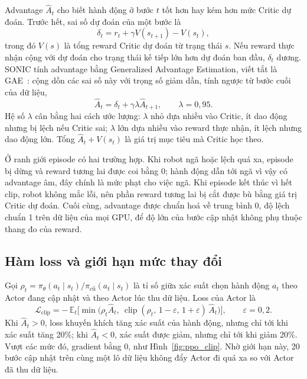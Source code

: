\documentclass[12pt,a4paper,oneside]{report}
\begin{document}
Advantage $\hat A_t$ cho biết hành động ở bước $t$ tốt hơn hay kém hơn mức Critic dự đoán. Trước hết, sai số dự đoán của một bước là
\begin{equation}
\delta_t = r_t + \gamma V(s_{t+1}) - V(s_t),
\end{equation}
trong đó $V(s)$ là tổng reward Critic dự đoán từ trạng thái $s$. Nếu reward thực nhận cộng với dự đoán cho trạng thái kế tiếp lớn hơn dự đoán ban đầu, $\delta_t$ dương. SONIC tính advantage bằng Generalized Advantage Estimation, viết tắt là GAE~\cite{gae}: cộng dồn các sai số này với trọng số giảm dần, tính ngược từ bước cuối của dữ liệu,
\begin{equation}
\hat A_t = \delta_t + \gamma \lambda \hat A_{t+1}, \qquad \lambda = 0{,}95.
\label{eq:gae}
\end{equation}
Hệ số $\lambda$ cân bằng hai cách ước lượng: $\lambda$ nhỏ dựa nhiều vào Critic, ít dao động nhưng bị lệch nếu Critic sai; $\lambda$ lớn dựa nhiều vào reward thực nhận, ít lệch nhưng dao động lớn. Tổng $\hat A_t + V(s_t)$ là giá trị mục tiêu mà Critic học theo.

Ở ranh giới episode có hai trường hợp. Khi robot ngã hoặc lệch quá xa, episode bị dừng và reward tương lai được coi bằng 0; hành động dẫn tới ngã vì vậy có advantage âm, đây chính là mức phạt cho việc ngã. Khi episode kết thúc vì hết clip, robot không mắc lỗi, nên phần reward tương lai bị cắt được bù bằng giá trị Critic dự đoán. Cuối cùng, advantage được chuẩn hoá về trung bình 0, độ lệch chuẩn 1 trên dữ liệu của mọi GPU, để độ lớn của bước cập nhật không phụ thuộc thang đo của reward.

\subsection{Hàm loss và giới hạn mức thay đổi}
\label{sec:ppo_loss}

Gọi $\rho_t = \pi_\theta(a_t \mid s_t) / \pi_{\text{cũ}}(a_t \mid s_t)$ là tỉ số giữa xác suất chọn hành động $a_t$ theo Actor đang cập nhật và theo Actor lúc thu dữ liệu. Loss của Actor là
\begin{equation}
\mathcal{L}_{\text{clip}} = -\,\mathbb{E}_t\Big[\min\big(\rho_t \hat A_t,\ \operatorname{clip}(\rho_t,\, 1-\varepsilon,\, 1+\varepsilon)\, \hat A_t\big)\Big], \qquad \varepsilon = 0{,}2.
\label{eq:ppo_clip}
\end{equation}
Khi $\hat A_t > 0$, loss khuyến khích tăng xác suất của hành động, nhưng chỉ tới khi xác suất tăng 20\%; khi $\hat A_t < 0$, xác suất được giảm, nhưng chỉ tới khi giảm 20\%. Vượt các mức đó, gradient bằng 0, như Hình~\ref{fig:ppo_clip}. Nhờ giới hạn này, 20 bước cập nhật trên cùng một lô dữ liệu không đẩy Actor đi quá xa so với Actor đã thu dữ liệu.
\end{document}
